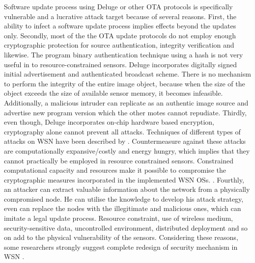 \documentclass[conference,final]{IEEEtran}
\newcommand{\notedme}[1]{\raisebox{0pt}[0pt][0pt]{\pdfcomment[open=true,color=blue]{#1}}}
\begin{document}
Software update process using Deluge or other OTA protocols is specifically vulnerable and a lucrative attack target because of several reasons.
First, the ability to infect a software update process implies effects beyond the updates only.
Secondly, most of the the OTA update protocols do not employ enough cryptographic protection for source authentication, integrity verification and likewise. 
The program binary authentication technique using a hash is not very useful in to resource-constrained sensors. 
Deluge incorporates digitally signed initial advertisement  and authenticated broadcast scheme. 
There is no mechanism to perform the integrity of the entire image object, because when the size of the object exceeds the size of available sensor memory, it becomes infeasible.
Additionally, a malicious intruder can replicate as an authentic image source and advertise new program version which the other motes cannot repudiate. 
Thirdly, even though,  Deluge incorporates on-chip hardware based encryption, cryptography alone cannot prevent all attacks. %
Techniques of different types of attacks  on WSN have been described by \cite{DBLP:journals/corr/abs-1301-3022}.
Countermeasure  against these attacks are computationally expansive/costly and energy hungry, which implies that they cannot practically be employed in resource constrained sensors. 
Constrained computational capacity and resources make it possible to compromise the cryptographic measures incorporated in the implemented WSN OSs. \cite{aes2011}.  %
Fourthly, an attacker can extract valuable information about the network from a physically compromised node.
He can utilise the knowledge to develop his attack strategy, even can replace the nodes with the illegitimate and malicious ones, which can imitate a legal update process. %
Resource constraint, use of wireless medium, security-sensitive data, uncontrolled environment, distributed deployment and so on add to the physical vulnerability of the sensors.
Considering these reasons, some researchers strongly suggest complete redesign of security mechanism in WSN \cite{quing09}.
\end{document}
